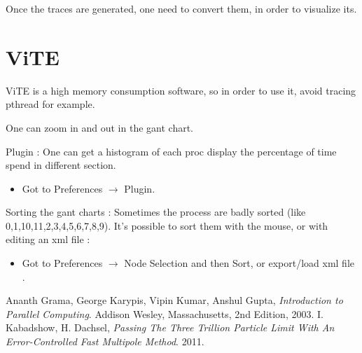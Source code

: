 \documentclass[12pt,letterpaper,titlepage]{report}
\begin{document}
Once the traces are generated, one need to convert them, in order to
visualize its.

\section{ViTE}
ViTE is a high memory consumption software, so in order to use it,
avoid tracing pthread for example.

One can zoom in and out in the gant chart.

Plugin : One can get a histogram of each proc display the percentage
of time spend in different section.
\begin{itemize}
  \item Got to Preferences $\rightarrow$ Plugin.
\end{itemize}

Sorting the gant charts : Sometimes the process are badly sorted (like
0,1,10,11,2,3,4,5,6,7,8,9). It's possible to sort them with the mouse,
or with editing an xml file : 
\begin{itemize}
  \item Got to Preferences $\rightarrow$ Node Selection and then Sort,
    or export/load xml file .
\end{itemize}


\begin{thebibliography}{9}
  Ananth Grama, George Karypis, Vipin Kumar, Anshul Gupta,
  \emph{Introduction to Parallel Computing}.
  Addison Wesley, Massachusetts,
  2nd Edition,
  2003.
  I. Kabadshow, H. Dachsel,
  \emph{Passing The Three Trillion Particle Limit With An Error-Controlled Fast Multipole Method}.
  2011.
\end{thebibliography}
\end{document}

